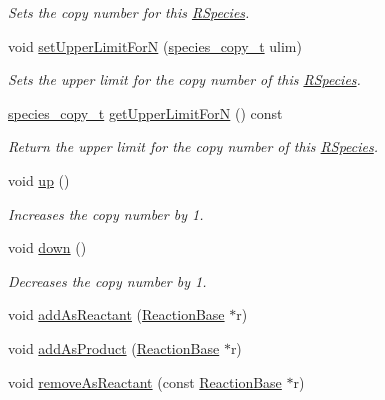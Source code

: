 \begin{DoxyCompactItemize}
\begin{DoxyCompactList}\small\item\em Sets the copy number for this \hyperlink{classchem_1_1RSpecies}{R\-Species}. \end{DoxyCompactList}\item 
void \hyperlink{classchem_1_1RSpecies_a13c47ccb546b64f83ac09734c286fcd2}{set\-Upper\-Limit\-For\-N} (\hyperlink{common_8h_a3503f321fd36304ee274141275cca586}{species\-\_\-copy\-\_\-t} ulim)
\begin{DoxyCompactList}\small\item\em Sets the upper limit for the copy number of this \hyperlink{classchem_1_1RSpecies}{R\-Species}. \end{DoxyCompactList}\item 
\hyperlink{common_8h_a3503f321fd36304ee274141275cca586}{species\-\_\-copy\-\_\-t} \hyperlink{classchem_1_1RSpecies_ad233880e065382e598a95e75d401d9eb}{get\-Upper\-Limit\-For\-N} () const 
\begin{DoxyCompactList}\small\item\em Return the upper limit for the copy number of this \hyperlink{classchem_1_1RSpecies}{R\-Species}. \end{DoxyCompactList}\item 
void \hyperlink{classchem_1_1RSpecies_ae721e3c649a12e0a81bc6b77afe23f38}{up} ()
\begin{DoxyCompactList}\small\item\em Increases the copy number by 1. \end{DoxyCompactList}\item 
void \hyperlink{classchem_1_1RSpecies_a0b9db54a1407d689be7477e77b4bb1c6}{down} ()
\begin{DoxyCompactList}\small\item\em Decreases the copy number by 1. \end{DoxyCompactList}\item 
void \hyperlink{classchem_1_1RSpecies_a2f69141d801e4660ab411953fef74ea2}{add\-As\-Reactant} (\hyperlink{classchem_1_1ReactionBase}{Reaction\-Base} $\ast$r)
\item 
void \hyperlink{classchem_1_1RSpecies_a0df14f94c944f38f8794dc9229f8079c}{add\-As\-Product} (\hyperlink{classchem_1_1ReactionBase}{Reaction\-Base} $\ast$r)
\item 
void \hyperlink{classchem_1_1RSpecies_ab8f32e15791cfddea7cf4cac5a39c0fa}{remove\-As\-Reactant} (const \hyperlink{classchem_1_1ReactionBase}{Reaction\-Base} $\ast$r)
\item 

\end{DoxyCompactItemize}
